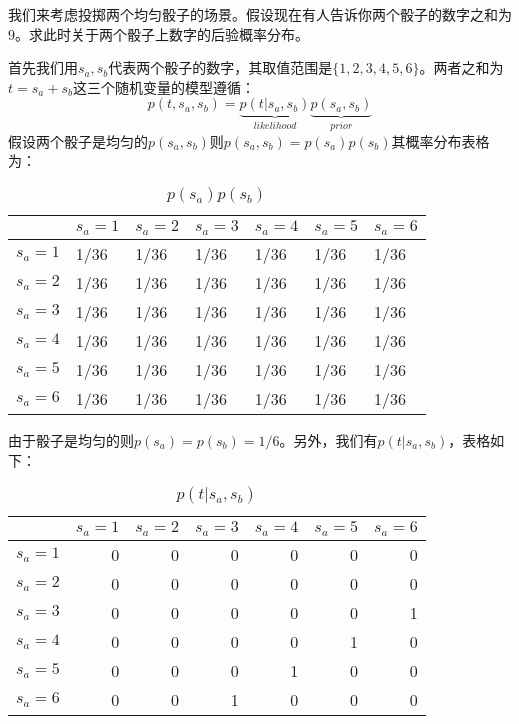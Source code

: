 \documentclass[10pt,a4paper,UTF8]{article}
\begin{document}
\begin{instance}
我们来考虑投掷两个均匀骰子的场景。假设现在有人告诉你两个骰子的数字之和为\(9\)。求此时关于两个骰子上数字的后验概率分布。

首先我们用\(s_{a},s_{b}\)代表两个骰子的数字，其取值范围是\(\{1,2,3,4,5,6\}\)。两者之和为\(t=s_{a} + s_{b}\)这三个随机变量的模型遵循：
\begin{equation}
\label{eq:11}
p(t,s_{a},s_{b}) = \underbrace{p(t|s_{a},s_{b})}_{likelihood}\underbrace{p(s_{a},s_{b})}_{prior}
\end{equation}
假设两个骰子是均匀的\(p(s_{a},s_{b})\)则\(p(s_{a},s_{b}) = p(s_{a})p(s_{b})\)其概率分布表格为：

\begin{table}[htbp]
\caption{\label{tab:orgd5cd133}
\(p(s_{a})p(s_{b})\)}
\centering
\begin{tabular}{lllllll}
\hline
 & \(s_{a} = 1\) & \(s_{a} = 2\) & \(s_{a} = 3\) & \(s_{a} = 4\) & \(s_{a} = 5\) & \(s_{a} = 6\)\\
\hline
\(s_{a} = 1\) & 1/36 & 1/36 & 1/36 & 1/36 & 1/36 & 1/36\\
\(s_{a} = 2\) & 1/36 & 1/36 & 1/36 & 1/36 & 1/36 & 1/36\\
\(s_{a} = 3\) & 1/36 & 1/36 & 1/36 & 1/36 & 1/36 & 1/36\\
\(s_{a} = 4\) & 1/36 & 1/36 & 1/36 & 1/36 & 1/36 & 1/36\\
\(s_{a} = 5\) & 1/36 & 1/36 & 1/36 & 1/36 & 1/36 & 1/36\\
\(s_{a} = 6\) & 1/36 & 1/36 & 1/36 & 1/36 & 1/36 & 1/36\\
\hline
\end{tabular}
\end{table}

由于骰子是均匀的则\(p(s_{a}) = p(s_{b}) = 1/6\)。另外，我们有\(p(t|s_{a},s_{b})\)，表格如下：
\begin{table}[htbp]
\caption{\label{tab:org8562b97}
\(p(t|s_{a},s_{b})\)}
\centering
\begin{tabular}{lrrrrrr}
\hline
 & \(s_{a} = 1\) & \(s_{a} = 2\) & \(s_{a} = 3\) & \(s_{a} = 4\) & \(s_{a} = 5\) & \(s_{a} = 6\)\\
\hline
\(s_{a} = 1\) & 0 & 0 & 0 & 0 & 0 & 0\\
\(s_{a} = 2\) & 0 & 0 & 0 & 0 & 0 & 0\\
\(s_{a} = 3\) & 0 & 0 & 0 & 0 & 0 & 1\\
\(s_{a} = 4\) & 0 & 0 & 0 & 0 & 1 & 0\\
\(s_{a} = 5\) & 0 & 0 & 0 & 1 & 0 & 0\\
\(s_{a} = 6\) & 0 & 0 & 1 & 0 & 0 & 0\\
\hline
\end{tabular}
\end{table}


\end{instance}
\end{document}
